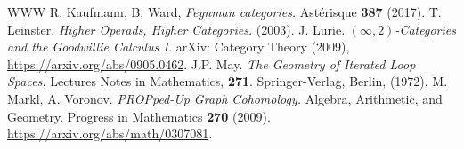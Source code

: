 \documentclass[letterpaper,12pt,leqno]{article}
\numberwithin{equation}{theorem}
\begin{document}
\begin{thebibliography}{WWW}
 R. Kaufmann, B. Ward, {\em Feynman categories.} Astérisque {\bf 387} (2017).
 T. Leinster. {\em Higher Operads, Higher Categories.} (2003).
 J. Lurie. {\em $(\infty,2)$-Categories and the Goodwillie Calculus I.} arXiv: Category Theory (2009), \href{https://arxiv.org/abs/0905.0462}{https://arxiv.org/abs/0905.0462}.
 J.P. May. {\em The Geometry of Iterated Loop Spaces.} Lectures Notes in Mathematics, {\bf 271}. Springer-Verlag, Berlin, (1972).
 M. Markl, A. Voronov. {\em PROPped-Up Graph Cohomology.} Algebra, Arithmetic, and Geometry. Progress in Mathematics {\bf 270} (2009).\\ \href{https://arxiv.org/abs/math/0307081}{https://arxiv.org/abs/math/0307081}.

\end{thebibliography}
\end{document}
